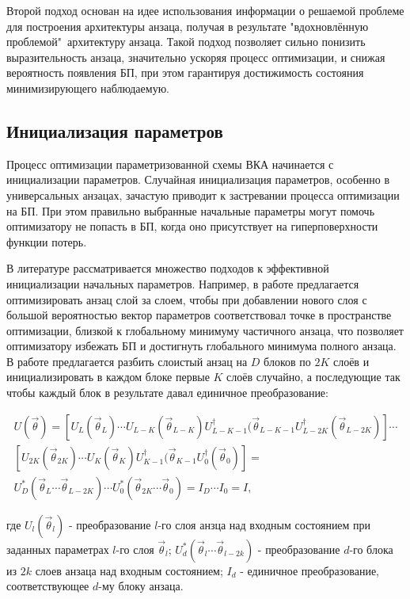 \documentclass[14pt]{extarticle}
\begin{document}
\qquad Второй подход основан на идее использования информации о решаемой проблеме для построения архитектуры анзаца, получая в результате "вдохновлённую проблемой"\ архитектуру анзаца. Такой подход позволяет сильно понизить выразительность анзаца, значительно ускоряя процесс оптимизации, и снижая вероятность появления БП, при этом гарантируя достижимость состояния минимизирующего наблюдаемую.

\subsection{Инициализация параметров} 

\qquad Процесс оптимизации параметризованной схемы ВКА начинается с инициализации параметров. Случайная инициализация параметров, особенно в универсальных анзацах, зачастую приводит к застревании процесса оптимизации на БП. При этом правильно выбранные начальные параметры могут помочь оптимизатору не попасть в БП, когда оно присутствует на гиперповерхности функции потерь.

\qquad В литературе рассматривается множество подходов к эффективной инициализации начальных параметров. Например, в работе \cite{Skolik_2021} предлагается оптимизировать анзац слой за слоем, чтобы при добавлении нового слоя с большой вероятностью вектор параметров соответствовал точке в пространстве оптимизации, близкой к глобальному минимуму частичного анзаца, что позволяет оптимизатору избежать БП и достигнуть глобального минимума полного анзаца. В работе \cite{Grant_2019} предлагается разбить слоистый анзац на $D$ блоков по $2K$ слоёв и инициализировать в каждом блоке первые $K$ слоёв случайно, а последующие так чтобы каждый блок в результате давал единичное преобразование:

\begin{multline}
U(\vec \theta) = [U_{L}(\vec{\theta}_{L}) \cdots U_{L-K}(\vec \theta_{L-K}) U^{\dagger}_{L-K-1}(\vec \theta_{L-K-1} U^{\dagger}_{L-2K}(\vec \theta_{L-2K})]  \cdots \\ 
[U_{2K}(\vec \theta_{2K}) \cdots U_{K}(\vec \theta_{K}) U^{\dagger}_{K-1}(\vec \theta_{K-1} U^{\dagger}_{0}(\vec \theta_{0})] =  \\  U^{*}_{D}(\vec  \theta_{L} \cdots \vec  \theta_{L-2K}) \cdots U^{*}_{0}(\vec \theta_{2K} \cdots \vec  \theta_{0}) =  I_{D} \cdots I_{0} = I,
\end{multline}

где $U_{l}(\vec \theta_{l})$ - преобразование $l$-го слоя анзца над входным состоянием при заданных параметрах  $l$-го слоя $\vec \theta_{l}$; $U^{*}_{d}(\vec  \theta_{l} \cdots \vec  \theta_{l-2k}) $ - преобразование $d$-го блока из $2k$ слоев анзаца над входным состоянием; $I_{d}$ - единичное преобразование, соответствующее $d$-му блоку анзаца.
\end{document}
